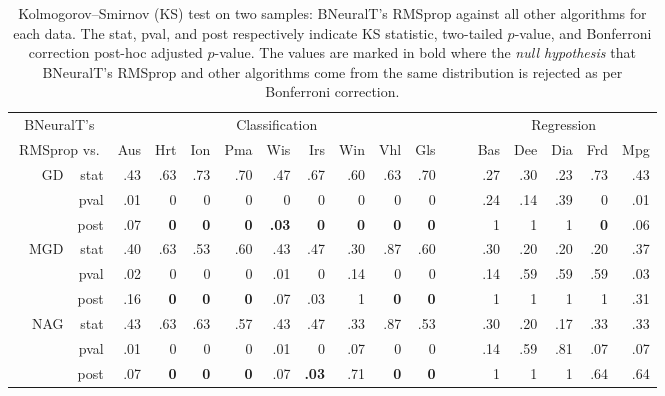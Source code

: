 \documentclass[11pt,a4paper]{article}
\begin{document}
    
    \begin{table} \small
        \centering
        \renewcommand{\arraystretch}{1.05}
        \setlength{\tabcolsep}{3pt}
        \caption{Kolmogorov–Smirnov (KS) test on two samples: BNeuralT's RMSprop against all other algorithms for each data. The stat, pval, and post respectively indicate KS statistic, two-tailed $p$-value, and Bonferroni correction post-hoc adjusted $p$-value. The values are marked in bold where the \textit{null hypothesis} that BNeuralT's RMSprop and other algorithms come from the same distribution is rejected as per Bonferroni correction.}
        \label{tab:BNeuralT_RMSprop_VS_All_KS_Test}
        \begin{tabular}[t]{lrrrrrrrrrrrrrrrrr}
            \toprule
            \multicolumn{3}{c}{BNeuralT's} & \multicolumn{9}{c}{Classification} & ~~ & \multicolumn{5}{c}{Regression} \\
            \cline{4-12}\cline{14-18}
            \multicolumn{3}{c}{RMSprop vs.}  & Aus & Hrt & Ion & Pma & Wis & Irs & Win & Vhl & Gls & ~ & Bas & Dee & Dia & Frd & Mpg \\
            \midrule
            \parbox[t]{3mm}{}
            & GD & stat & .43 & .63 & .73 & .70 & .47 & .67 & .60 & .63 & .70 &  & .27 & .30 & .23 & .73 & .43 \\
            & & pval & .01 & 0 & 0 & 0 & 0 & 0 & 0 & 0 & 0 &  & .24 & .14 & .39 & 0 & .01 \\
            & & post & .07 & \textbf{0} & \textbf{0} & \textbf{0} & \textbf{.03} & \textbf{0} & \textbf{0} & \textbf{0} & \textbf{0} &  & 1 & 1 & 1 & \textbf{0} & .06 \\
& MGD & stat & .40 & .63 & .53 & .60 & .43 & .47 & .30 & .87 & .60 &  & .30 & .20 & .20 & .20 & .37 \\
            & & pval & .02 & 0 & 0 & 0 & .01 & 0 & .14 & 0 & 0 &  & .14 & .59 & .59 & .59 & .03 \\
            & & post & .16 & \textbf{0} & \textbf{0} & \textbf{0} & .07 & .03 & 1 & \textbf{0} & \textbf{0} &  & 1 & 1 & 1 & 1 & .31 \\
& NAG & stat & .43 & .63 & .63 & .57 & .43 & .47 & .33 & .87 & .53 &  & .30 & .20 & .17 & .33 & .33 \\
            & & pval & .01 & 0 & 0 & 0 & .01 & 0 & .07 & 0 & 0 &  & .14 & .59 & .81 & .07 & .07 \\
            & & post & .07 & \textbf{0} & \textbf{0} & \textbf{0} & .07 & \textbf{.03} & .71 & \textbf{0} & \textbf{0} &  & 1 & 1 & 1 & .64 & .64 \\

\end{tabular}
\end{table}
\end{document}
